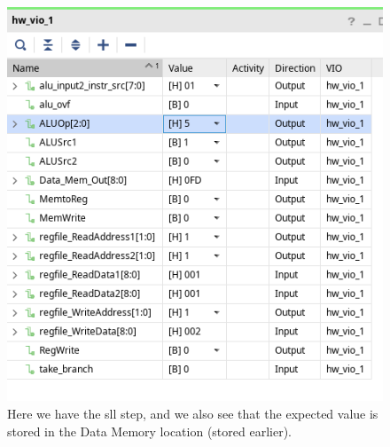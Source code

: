 \documentclass[12pt,a4paper]{article}
\begin{document}
\begin{figure}
	\includegraphics{image2}
	\caption{Here we have the sll step, and we also see that the expected
	value is stored in the Data Memory location (stored earlier).}
\end{figure}
\end{document}
